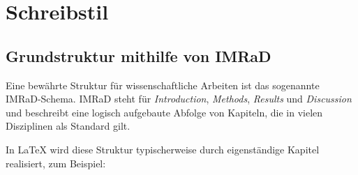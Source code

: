 \chapter{Schreibstil}

\section{Grundstruktur mithilfe von IMRaD}

Eine bewährte Struktur für wissenschaftliche Arbeiten ist das sogenannte IMRaD-Schema. 
IMRaD steht für \textit{Introduction}, \textit{Methods}, \textit{Results} und \textit{Discussion} und beschreibt eine logisch aufgebaute Abfolge von Kapiteln, die in vielen Disziplinen als Standard gilt.

In \LaTeX{} wird diese Struktur typischerweise durch eigenständige Kapitel realisiert, zum Beispiel:

